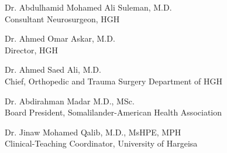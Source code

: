 \documentclass{article}
\begin{document}
Dr. Abdulhamid Mohamed Ali Suleman, M.D.\\
Consultant Neurosurgeon, HGH
%
%
\clearpage



Dr. Ahmed Omar Askar, M.D.\\
Director, HGH
%
%
\clearpage


Dr. Ahmed Saed Ali, M.D. \\
Chief, Orthopedic and Trauma Surgery Department of HGH
\clearpage



\clearpage

Dr. Abdirahman Madar M.D., MSc. \\
Board President, Somalilander-American Health Association
%
%
\clearpage

Dr. Jinaw Mohamed Qalib, M.D., MsHPE, MPH \\
Clinical-Teaching Coordinator, University of Hargeisa
%
%
\clearpage
\end{document}
